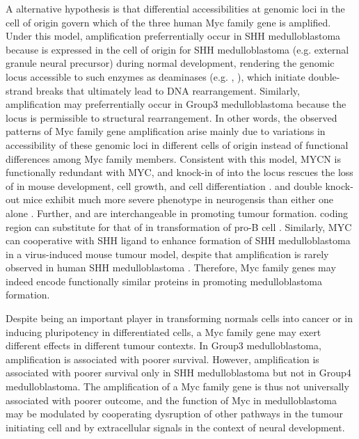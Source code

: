A alternative hypothesis is that differential accessibilities at genomic loci in the cell of origin govern which of the three human Myc family gene is amplified. Under this model,  amplification preferrentially occur in SHH medulloblastoma because  is expressed in the cell of origin for SHH medulloblastoma (e.g. external granule neural precursor) during normal development, rendering the genomic locus accessible to such enzymes as deaminases (e.g. , ), which initiate double-strand breaks that ultimately lead to DNA rearrangement. Similarly,  amplification may preferrentially occur in Group3 medulloblastoma because the  locus is permissible to structural rearrangement. In other words, the observed patterns of Myc family gene amplification arise mainly due to variations in accessibility of these genomic loci in different cells of origin instead of functional differences among Myc family members. Consistent with this model, MYCN is functionally redundant with MYC, and knock-in of  into the  locus rescues the loss of  in mouse development, cell growth, and cell differentiation .  and  double knock-out mice exhibit much more severe phenotype in neurogensis than either one alone . Further,  and  are interchangeable in promoting tumour formation.  coding region can substitute for that of  in transformation of pro-B cell . Similarly, MYC can cooperative with SHH ligand to enhance formation of SHH medulloblastoma in a virus-induced mouse tumour model, despite that  amplification is rarely observed in human SHH medulloblastoma . Therefore, Myc family genes may indeed encode functionally similar proteins in promoting medulloblastoma formation.

Despite being an important player in transforming normals cells into cancer or in inducing pluripotency in differentiated cells, a Myc family
gene may exert different effects in different tumour contexts. In Group3 medulloblastoma,  amplification is associated with poorer survival. However,  amplification is associated with poorer survival only in SHH medulloblastoma but not in Group4 medulloblastoma. The amplification of a Myc family gene is thus not universally associated with poorer outcome, and the function of Myc in medulloblastoma may be modulated by cooperating dysruption of other pathways in the tumour initiating cell and by extracellular signals in the context of neural development.

